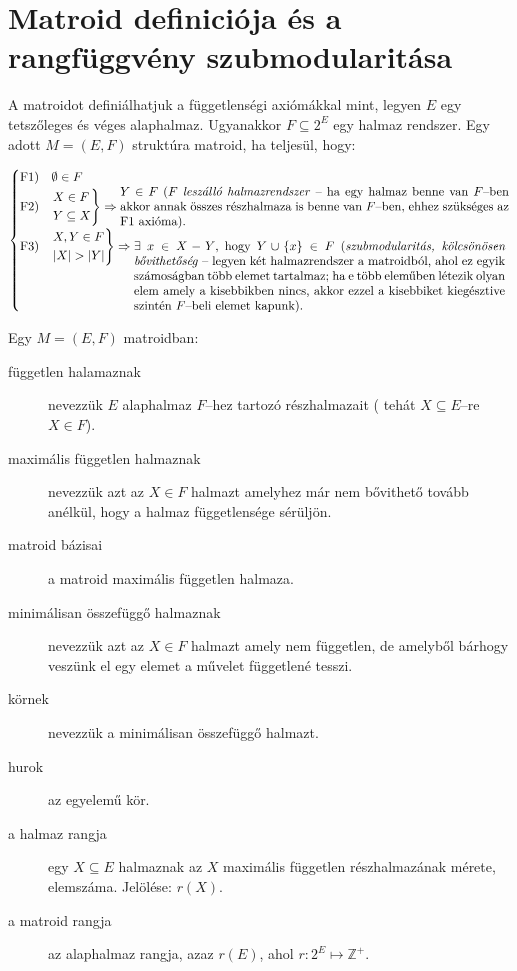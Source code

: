 \section{Matroid definiciója és a rangfüggvény szubmodularitása}

A matroidot definiálhatjuk a függetlenségi axiómákkal mint, legyen $E$ egy
tetszőleges és véges alaphalmaz. Ugyanakkor $F \subseteq  2^E$ egy halmaz
rendszer. Egy adott $M=(E,F)$ struktúra matroid, ha teljesül, hogy:

\[
\begin{cases}
\mbox{F1}) &\emptyset \in F \\
\mbox{F2}) &\begin{rcases}
X \in F \\ 
Y \subseteq X 
\end{rcases} \Rightarrow \parbox[L]{11cm}{$Y \in F$
($F$ \emph{leszálló halmazrendszer} -- ha egy halmaz benne van $F$--ben akkor annak összes
részhalmaza is benne van $F$--ben, ehhez szükséges az F$1$ axióma).
} \\
\mbox{F3}) &\begin{rcases}
X,Y \in F\\
|X| > |Y| \\
\end{rcases} \Rightarrow\parbox[t]{10.5cm}{ $\exists~x \in X-Y$,~hogy $Y \cup \{x\}
\in F~($\emph{szubmodularitás, kölcsönösen bővithetőség} -- legyen két halmazrendszer
a matroidból, ahol ez egyik számoságban több elemet tartalmaz; ha e több
eleműben létezik olyan elem amely a kisebbikben nincs, akkor ezzel a kisebbiket
kiegésztive szintén $F$--beli elemet kapunk).}
\end{cases}
\]

Egy $M=(E,F)$ matroidban: 

\begin{description}
  \item[független halamaznak] nevezzük $E$ alaphalmaz $F$--hez tartozó
  részhalmazait ( tehát $X\subseteq E$--re $X \in F$).
  \item[maximális független halmaznak] nevezzük azt az $X \in F$ halmazt
  amelyhez már nem bővithető tovább anélkül, hogy a halmaz függetlensége
  sérüljön.
  \item[matroid bázisai] a matroid maximális független halmaza.
  \item[minimálisan összefüggő halmaznak] nevezzük azt az $X \in F$ halmazt
  amely nem független, de amelyből bárhogy veszünk el egy elemet a művelet
  függetlené tesszi.
  \item[körnek] nevezzük a minimálisan összefüggő halmazt.
  \item[hurok] az egyelemű kör. 
  \item[a halmaz rangja] egy $X\subseteq E$ halmaznak az $X$ maximális
  független részhalmazának mérete, elemszáma. Jelölése: $r(X)$.
  \item[a matroid rangja] az alaphalmaz rangja, azaz $r(E)$, ahol $r:2^E \mapsto \mathbb{Z}^+$.
\end{description}

